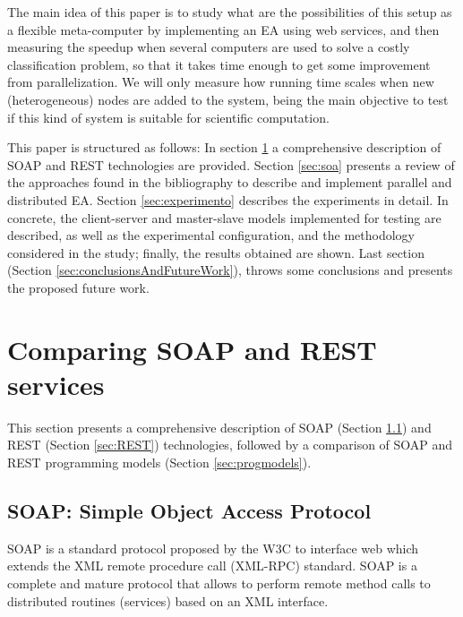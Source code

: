 \documentclass[final,1p,times]{elsarticle}
\begin{document}
The main idea of this paper %
is to study what are the possibilities of this setup as a flexible meta-computer by implementing an EA using web services, and then measuring the speedup when several computers are used to solve a costly classification problem, so that it takes time enough to get some improvement from parallelization. 
We will only measure how running time scales when new (heterogeneous) nodes are added to the system, being the main objective to test if this kind of system is suitable for scientific computation.

\medskip

This paper is structured as follows:
In section \ref{sec:SOAPvsREST} a comprehensive description of SOAP and REST technologies are provided.
Section \ref{sec:soa} presents a review of the approaches found in the bibliography to describe and implement parallel and distributed EA.
Section \ref{sec:experimento} describes the experiments in detail. In concrete, the client-server and master-slave models implemented for testing are described,
as well as the experimental configuration, and the methodology considered in the study; finally, the results obtained are shown.
Last section (Section \ref{sec:conclusionsAndFutureWork}), throws some conclusions and presents the proposed future work.


\section{Comparing SOAP and REST services}
\label{sec:SOAPvsREST}

This section presents a comprehensive description of SOAP (Section \ref{sec:SOAP}) and REST (Section \ref{sec:REST}) technologies, followed by a comparison of SOAP and REST programming models (Section \ref{sec:progmodels}).


\subsection{SOAP: Simple Object Access Protocol}
\label{sec:SOAP}

SOAP is a standard protocol proposed by the W3C \cite{SOAP} to interface web  which  extends the XML remote procedure call (XML-RPC) standard. 
SOAP is a complete and mature protocol that allows to perform remote method calls to distributed routines (services) based on an XML interface.
\end{document}
